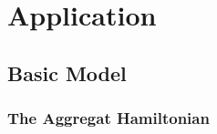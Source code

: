 \chapter{Application}
\label{chap:app}


\section{Basic Model}
\label{sec:app.model}
%


\subsection{The Aggregat Hamiltonian}
\label{sub:app.model.hamiltonian}

%

